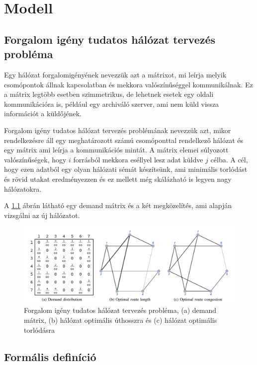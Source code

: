 \documentclass[12pt]{report}
\begin{document}
\chapter{Modell}

\section{Forgalom igény tudatos hálózat tervezés probléma}

Egy hálózat forgalomigényének nevezzük azt a mátrixot, mi leírja melyik csomópontok állnak kapcsolatban és mekkora valószínűséggel kommunikálnak.
Ez a mátrix legtöbb esetben szimmetrikus, de lehetnek esetek egy oldali kommunikációra is, például egy archiváló szerver, ami nem küld vissza információt a küldőjének.

Forgalom igény tudatos hálózat tervezés problémának nevezzük azt, mikor rendelkezésre áll egy meghatározott számú csomóponttal rendelkező hálózat és egy mátrix ami leírja a kommunikációs mintát.
A mátrix elemei súlyozott valószínűségek, hogy $i$ forrásból mekkora eséllyel lesz adat küldve $j$ célba.
A cél, hogy ezen adatból egy olyan hálózati sémát készítsünk, ami minimális torlódást és rövid utakat eredményezzen és ez mellett még skálázható is legyen nagy hálózatokra.

A \ref{network_types} ábrán látható egy demand mátrix és a két megközelítés, ami alapján vizsgálni az új hálózatot.

\begin{figure}[h]
	\centering
	\includegraphics[width=14cm]{pictures/example.png}
	\caption{Forgalom igény tudatos hálózat tervezés probléma, (a) demand mátrix, (b) hálózat optimális úthosszra és (c) hálózat optimális torlódásra}
	\label{network_types}
\end{figure}

\section{Formális definíció}
\end{document}
